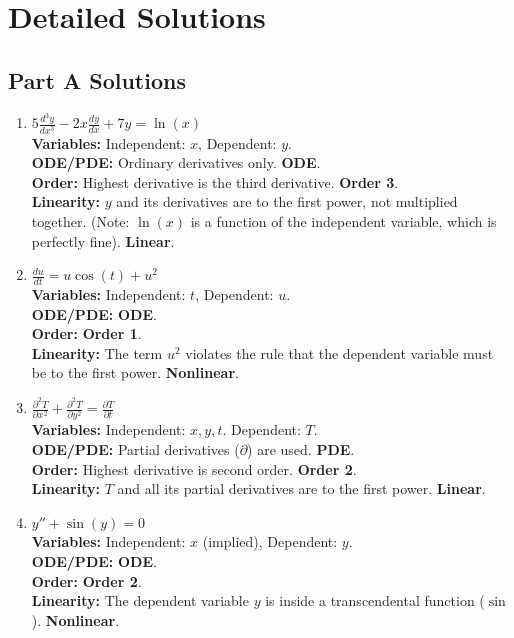 \documentclass{article}
\begin{document}
\newpage

\section{Detailed Solutions}

\subsection*{Part A Solutions}
\begin{enumerate}
    \item $5 \frac{d^3 y}{dx^3} - 2x \frac{dy}{dx} + 7y = \ln(x)$ \\
    \textbf{Variables:} Independent: $x$, Dependent: $y$. \\
    \textbf{ODE/PDE:} Ordinary derivatives only. \textbf{ODE}. \\
    \textbf{Order:} Highest derivative is the third derivative. \textbf{Order 3}. \\
    \textbf{Linearity:} $y$ and its derivatives are to the first power, not multiplied together. (Note: $\ln(x)$ is a function of the independent variable, which is perfectly fine). \textbf{Linear}.
    
    \item $\frac{du}{dt} = u \cos(t) + u^2$ \\
    \textbf{Variables:} Independent: $t$, Dependent: $u$. \\
    \textbf{ODE/PDE:} \textbf{ODE}. \\
    \textbf{Order:} \textbf{Order 1}. \\
    \textbf{Linearity:} The term $u^2$ violates the rule that the dependent variable must be to the first power. \textbf{Nonlinear}.
    
    \item $\frac{\partial^2 T}{\partial x^2} + \frac{\partial^2 T}{\partial y^2} = \frac{\partial T}{\partial t}$ \\
    \textbf{Variables:} Independent: $x, y, t$. Dependent: $T$. \\
    \textbf{ODE/PDE:} Partial derivatives ($\partial$) are used. \textbf{PDE}. \\
    \textbf{Order:} Highest derivative is second order. \textbf{Order 2}. \\
    \textbf{Linearity:} $T$ and all its partial derivatives are to the first power. \textbf{Linear}.
    
    \item $y'' + \sin(y) = 0$ \\
    \textbf{Variables:} Independent: $x$ (implied), Dependent: $y$. \\
    \textbf{ODE/PDE:} \textbf{ODE}. \\
    \textbf{Order:} \textbf{Order 2}. \\
    \textbf{Linearity:} The dependent variable $y$ is inside a transcendental function ($\sin$). \textbf{Nonlinear}.
    

\end{enumerate}
\end{document}
